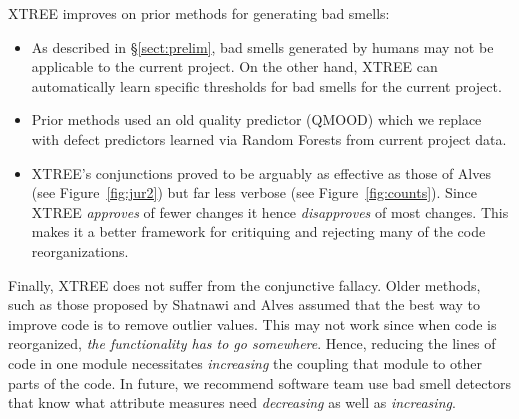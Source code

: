 \documentclass[twocolumn,5p]{elsarticle}
\newcommand{\tion}[1]{\S\ref{sect:#1}}
\newcommand{\fig}[1]{Figure~\ref{fig:#1}}
\theoremstyle{break}
\begin{document}
	XTREE improves on prior methods for generating bad smells:
	\begin{itemize}
		\item As described in \tion{prelim}, bad smells generated by humans may 
		not be applicable to the current project. On the other hand, XTREE can 
		automatically learn specific thresholds
		for bad smells for the current project.
		\item Prior methods used an old quality predictor (QMOOD) which we 
		replace with defect predictors learned via Random Forests
		from   current project data.
		
		
		\item XTREE's conjunctions proved to be arguably as effective
		as those of Alves (see \fig{jur2}) but far less verbose (see 
		\fig{counts}). Since XTREE {\em approves} of fewer changes
		it hence {\em disapproves} of most changes. This makes it a better 
		framework 
		for critiquing and rejecting
		many of the code reorganizations.
	\end{itemize}
	Finally, XTREE does not suffer from the conjunctive fallacy.
	Older methods, such as those proposed by  Shatnawi and Alves assumed
	that the best way to improve code is to remove outlier  values. This may 
	not work since when code is reorganized,
	{\em the functionality has to go somewhere}. Hence,  reducing the lines of 
	code in one module necessitates
	{\em increasing} the coupling that module
	to other parts of the code. In future, we recommend software team use bad 
	smell detectors that know what attribute measures
	need {\em decreasing} as well as {\em increasing}.
	
	
	
\end{document}
